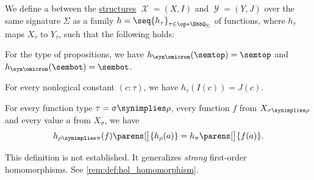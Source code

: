 \begin{definition}\label{def:hol_homomorphism}\mimprovised
  We define a  between the \hyperref[def:hol_structure]{structures} \( \mscrX = (X, I) \) and \( \mscrY = (Y, J) \) over the same signature \( \Sigma \) as a family \( h = \seq{ h_\tau }_{\tau \in \op*{\BbbQ_\Sigma}} \) of functions, where \( h_\tau \) maps \( X_\tau \) to \( Y_\tau \), such that the following holds:
  \begin{thmenum}
     For the type of propositions, we have \( h_{\syn\omicron}(\semtop) = \semtop \) and \( h_{\syn\omicron}(\sembot) = \sembot \).

     For every nonlogical constant \( (c: \tau) \), we have \( h_\tau(I(c)) = J(c) \).

     For every function type \( \tau = \sigma \synimplies \rho \), every function \( f \) from \( X_{\sigma \synimplies \rho} \) and every value \( a \) from \( X_\sigma \), we have
    \begin{equation}\label{eq:def:hol_homomorphism/arrow}
      h_{\rho \synimplies \pi}(f) \parens[\big]{ h_\rho(a) } = h_\pi\parens[\big]{ f(a) }.
    \end{equation}
  \end{thmenum}
\end{definition}
\begin{comments}
  \item This definition is not established. It generalizes \emph{strong} first-order homomorphisms. See \cref{rem:def:hol_homomorphism}.
\end{comments}

